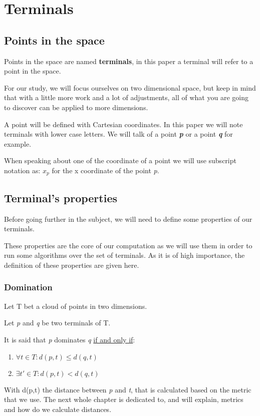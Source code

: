 \chapter{Terminals}
\section{Points in the space}
Points in the space are named \textbf{terminals}, in this paper a terminal will refer to a point in the space.\newline

For our study, we will focus ourselves on two dimensional space, but keep in mind that with a little more work and a lot of adjustments, all of what you are going to discover can be applied to more dimensions.

A point will be defined with Cartesian coordinates. In this paper we will note terminals with lower case letters. We will talk of a point \textbf{\emph{p}} or a point \textbf{\emph{q}} for example.

When speaking about one of the coordinate of a point we will use subscript notation as: $x_p$ for the x coordinate of the point \emph{p}.

\section{Terminal's properties} %
Before going further in the subject, we will need to define some properties of our terminals.

These properties are the core of our computation as we will use them in order to run some algorithms over the set of terminals. As it is of high importance, the definition of these properties are given here. 
\subsection{Domination} %
Let T bet a cloud of points in two dimensions.

Let \emph{p} and \emph{q} be two terminals of T.

\noindent It is said that \emph{p} dominates \emph{q} \underline{if and only if}:
\begin{enumerate}
	\item{$\forall t \in T : d(p,t) \leq d(q,t)$}
	\item{$\exists t' \in T : d(p,t) < d(q,t)$}
\end{enumerate} 
With d(p,t) the distance between \emph{p} and \emph{t}, that is calculated based on the metric that we use. The next whole chapter is dedicated to, and will explain, metrics and how do we calculate distances.

